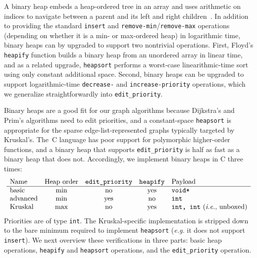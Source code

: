 \lstset{style=myTinyStyle}

A binary heap embeds a heap-ordered tree in an array and uses arithmetic on indices to navigate between a parent and its left and right children~\cite{clrs}.  In addition to providing the standard \texttt{insert} and \texttt{remove-min}/\texttt{remove-max} operations (depending on whether it is a min- or max-ordered heap) in logarithmic time, binary heaps can by upgraded to support two nontrivial operations.  First, Floyd's \texttt{heapify} function builds a binary heap from an unordered array in linear time, and as a related upgrade, \texttt{heapsort} performs a worst-case linearithmic-time sort using only constant additional space.  Second, binary heaps can be upgraded to support logarithmic-time \texttt{decrease-} and \texttt{increase-priority} operations, which we generalize straightforwardly into \texttt{edit\_priority}.

Binary heaps are a good fit for our graph algorithms because Dijkstra's and Prim's algorithms need to edit priorities, and a constant-space \texttt{heapsort} is appropriate for the sparse edge-list-represented graphs typically targeted by Kruskal's.  The~C language has poor support for polymorphic higher-order functions, and a binary heap that supports \texttt{edit\_priority} is half as fast as a binary heap that does not.  Accordingly, we implement binary heaps in C three times:
\[
\begin{array}{l@{\quad}c@{\quad}c@{\quad}c@{\quad}l}
\text{Name} & \text{Heap order} & \texttt{edit\_priority} & \texttt{heapify} & \text{Payload} \\
\hline
\text{basic} & \text{min} & \text{no} & \text{yes} & \texttt{void*} \\
\text{advanced} & \text{min} & \text{yes} & \text{no} & \texttt{int} \\
\text{Kruskal} & \text{max} & \text{no} & \text{yes} & \texttt{int, int} \text{ (\emph{i.e.}, unboxed)}
\end{array}
\]
Priorities are of type \texttt{int}.  %
The Kruskal-specific implementation is stripped down to the bare minimum required to implement \texttt{heapsort} (\emph{e.g.} it does not support \texttt{insert}).  We next overview these verifications in three parts: basic heap operations, \texttt{heapify} and \texttt{heapsort} operations, and the \texttt{edit\_priority} operation.

